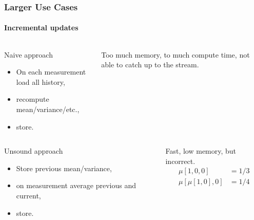 \documentclass{beamer}
\begin{document}
\begin{frame}
  \frametitle{Larger Use Cases}
  \framesubtitle{Incremental updates}
  \begin{columns}[c]
      \begin{block}{Naive approach}
        \begin{itemize}
        \item On each measurement load all history,
        \item recompute mean/variance/etc.,
        \item store.
        \end{itemize}
      \end{block}

  Too much \alert{memory}, to much compute \alert{time}, not able to \alert{catch up}
  to the stream.
  \end{columns}

  \pause

  \begin{columns}[c]
      \begin{block}{Unsound approach}
        \begin{itemize}
        \item Store previous mean/variance,
        \item on measurement average previous and current,
        \item store.
        \end{itemize}
      \end{block}

    Fast, low memory, but \alert{incorrect}.
    \begin{align*}
      \mu[1,0,0] & = 1/3 \\
      \mu[\mu[1,0], 0] &= 1/4
    \end{align*}

  \end{columns}
\end{frame}
\end{document}
